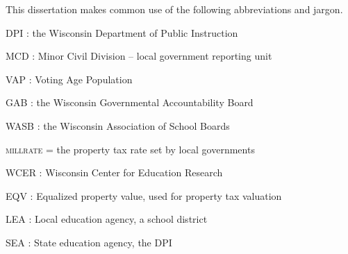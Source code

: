 This dissertation makes common use of the following abbreviations and jargon. 

\begin{myitemize}
\item \textsc{DPI} : the Wisconsin Department of Public Instruction
\item \textsc{MCD} : Minor Civil Division -- local government reporting unit
\item \textsc{VAP} : Voting Age Population
\item \textsc{GAB} : the Wisconsin Governmental Accountability Board
\item \textsc{WASB} : the Wisconsin Association of School Boards
\item \textsc{millrate} = the property tax rate set by local governments
\item \textsc{WCER} : Wisconsin Center for Education Research
\item \textsc{EQV} : Equalized property value, used for property tax valuation
\item \textsc{LEA} : Local education agency, a school district
\item \textsc{SEA} : State education agency, the DPI
\end{myitemize}
